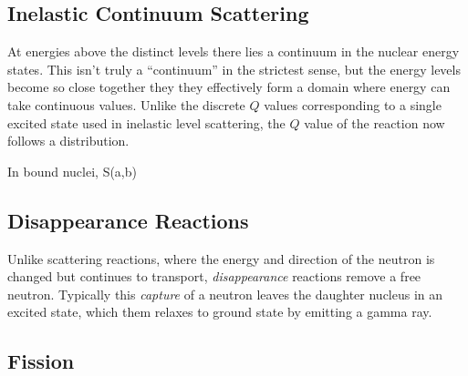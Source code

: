 \subsection{Inelastic Continuum Scattering}

At energies above the distinct levels there lies a continuum in the nuclear energy states.  This isn't truly a ``continuum'' in the strictest sense, but the energy levels become so close together they they effectively form a domain where energy can take continuous values.  Unlike the discrete $Q$ values corresponding to a single excited state used in inelastic level scattering, the $Q$ value of the reaction now follows a distribution.  

In bound nuclei, S(a,b)

\subsection{Disappearance Reactions}

Unlike scattering reactions, where the energy and direction of the neutron is changed but continues to transport, \emph{disappearance} reactions remove a free neutron.  Typically this \emph{capture} of a neutron leaves the daughter nucleus in an excited state, which them relaxes to ground state by emitting a gamma ray.


\subsection{Fission}

